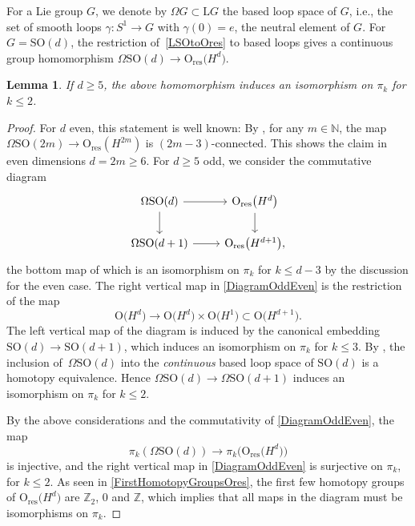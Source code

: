 \documentclass[11pt]{article}
\numberwithin{equation}{section}
\numberwithin{equation}{section}
\newtheorem{Lemma}[Theorem]{Lemma}
\newcommand{\N}{\mathbb{N}}
\newcommand{\Z}{\mathbb{Z}}
\newcommand{\SO}{\mathrm{SO}}
\newcommand{\res}{\mathrm{res}}
\renewcommand{\O}{\mathrm{O}}
\renewcommand{\L}{\mathrm{L}}
\begin{document}
For a Lie group $G$, we denote by $\Omega G \subset \L G$ the based loop space of $G$, i.e., the set of smooth loops $\gamma\colon S^1 \to G$ with $\gamma(0) = e$, the neutral element of $G$.
For $G = \SO(d)$, the restriction of~\eqref{LSOtoOres} to based loops gives a continuous group homomorphism $\Omega \SO(d) \longrightarrow \O_{\res}\big(H^d\big)$.

\begin{Lemma} \label{LemmaPi2Iso}
If $d \geq 5$, the above homomorphism induces an isomorphism on $\pi_k$ for $k \leq 2$.
\end{Lemma}

\begin{proof}
For $d$ even, this statement is well known: By \cite[Proposition~12.5.2]{PressleySegal}, for any $m \in \N$, the map $\Omega\SO(2m) \to \O_{\res}(H^{2m})$ is $(2m-3)$-connected.
This shows the claim in even dimensions $d=2m \geq 6$.
For $d \geq 5$ odd, we consider the commutative diagram
\begin{equation} \label{DiagramOddEven}
\begin{tikzcd}
\Omega\SO(d) \ar[d] \ar[r] & \O_{\res}\big(H^d\big) \ar[d] \\
\Omega\SO(d+1) \ar[r] & \O_{\res}\big(H^{d+1}\big),
\end{tikzcd}
\end{equation}
the bottom map of which is an isomorphism on $\pi_k$ for $k \leq d-3$ by the discussion for the even case.
The right vertical map in \eqref{DiagramOddEven} is the restriction of the map
\[\O\big(H^d\big) \to \O\big(H^d\big) \times \O\big(H^1\big) \subset \O\big(H^{d+1}\big).\]
 The left vertical map of the diagram is induced by the canonical embedding $\SO(d) \to \SO(d+1)$, which induces an isomorphism on $\pi_k$ for $k \leq 3$. By \cite[Proposition~7.1]{CareyCrowleyMurray}, the inclusion of~$\Omega \SO(d)$ into the \emph{continuous} based loop space of $\SO(d)$ is a homotopy equivalence. Hence $\Omega \SO(d) \to \Omega\SO(d+1)$ induces an isomorphism on $\pi_k$ for $k \leq 2$.

By the above considerations and the commutativity of \eqref{DiagramOddEven}, the map \[\pi_k(\Omega\SO(d)) \to \pi_k\big(\O_{\res}\big(H^d\big)\big)\]
 is injective, and the right vertical map in \eqref{DiagramOddEven} is surjective on $\pi_k$, for $k \leq 2$.
As seen in \eqref{FirstHomotopyGroupsOres}, the first few homotopy groups of $\O_{\res}\big(H^d\big)$ are $\Z_2$, $0$ and $\Z$, which implies that all maps in the diagram must be isomorphisms on $\pi_k$.
\end{proof}
\end{document}
